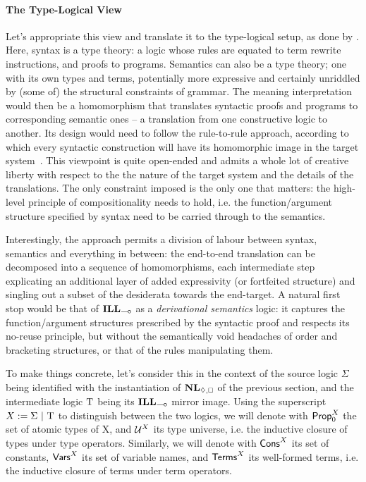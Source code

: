 \paragraph{The Type-Logical View}
Let's appropriate this view and translate it to the type-logical setup, as done by \citet{van1988semantics}.
Here, syntax is a type theory: a logic whose rules are equated to term rewrite instructions, and proofs to programs.
Semantics can also be a type theory; one with its own types and terms, potentially more expressive and certainly unriddled by (some of) the structural constraints of grammar.
The meaning interpretation would then be a homomorphism that translates syntactic proofs and programs to corresponding semantic ones -- a translation from one constructive logic to another.
Its design would need to follow the rule-to-rule approach, according to which every syntactic construction will have its homomorphic image in the target system~\cite{bach1976extension}.
This viewpoint is quite open-ended and admits a whole lot of creative liberty with respect to the the nature of the target system and the details of the translations.
The only constraint imposed is the only one that matters: the high-level principle of compositionality needs to hold, i.e. the function/argument structure specified by syntax need to be carried through to the semantics.

Interestingly, the approach permits a division of labour between syntax, semantics and everything in between: the end-to-end translation can be decomposed into a sequence of homomorphisms, each intermediate step explicating an additional layer of added expressivity (or fortfeited structure) and singling out a subset of the desiderata towards the end-target.
A natural first stop would be that of $\ILL_{\li}$ as a \textit{derivational semantics} logic: it captures the function/argument structures prescribed by the syntactic proof and respects its no-reuse principle, but without the semantically void headaches of order and bracketing structures, or that of the rules manipulating them. 

To make things concrete, let's consider this in the context of the source logic $\Sigma$ being identified with the instantiation of $\NL_{\diamond,\bx}$ of the previous section, and the intermediate logic $\mathrm{T}$ being its $\ILL_{\li}$ mirror image.
Using the superscript $X := \Sigma \ | \ \Tau$ to distinguish between the two logics,
we will denote with $\mathsf{Prop}_0^X$ the set of atomic types of X, and $\mathcal{U}^X$ its type universe, i.e. the inductive closure of types under type operators.
Similarly, we will denote with $\mathsf{Cons}^{X}$ its set of constants, $\mathsf{Vars}^{X}$ its set of variable names, and $\mathsf{Terms}^{X}$ its well-formed terms, i.e. the inductive closure of terms under term operators.

